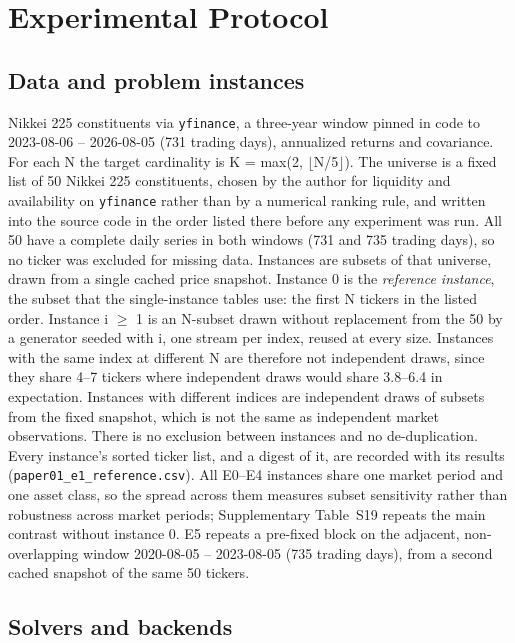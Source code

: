 \documentclass{ieeeaccess}
\begin{document}
\section{Experimental Protocol}


\subsection{Data and problem instances}


Nikkei 225 constituents via \texttt{yfinance}, a three-year window pinned in code to 2023-08-06 -- 2026-08-05 (731 trading days), annualized returns and covariance. For each N the target cardinality is K = max(2, $\lfloor$N/5$\rfloor$). The universe is a fixed list of 50 Nikkei 225 constituents, chosen by the author for liquidity and availability on \texttt{yfinance} rather than by a numerical ranking rule, and written into the source code in the order listed there before any experiment was run. All 50 have a complete daily series in both windows (731 and 735 trading days), so no ticker was excluded for missing data. Instances are subsets of that universe, drawn from a single cached price snapshot. Instance 0 is the \textit{reference instance}, the subset that the single-instance tables use: the first N tickers in the listed order. Instance i $\geq$ 1 is an N-subset drawn without replacement from the 50 by a generator seeded with i, one stream per index, reused at every size. Instances with the same index at different N are therefore not independent draws, since they share 4--7 tickers where independent draws would share 3.8--6.4 in expectation. Instances with different indices are independent draws of subsets from the fixed snapshot, which is not the same as independent market observations. There is no exclusion between instances and no de-duplication. Every instance's sorted ticker list, and a digest of it, are recorded with its results (\texttt{paper01\_e1\_reference.csv}). All E0--E4 instances share one market period and one asset class, so the spread across them measures subset sensitivity rather than robustness across market periods; Supplementary Table~S19 repeats the main contrast without instance 0. E5 repeats a pre-fixed block on the adjacent, non-overlapping window 2020-08-05 -- 2023-08-05 (735 trading days), from a second cached snapshot of the same 50 tickers.


\subsection{Solvers and backends}
\end{document}
